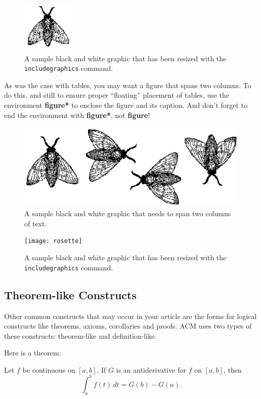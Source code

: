 \begin{figure}
    \includegraphics[height=1in, width=1in]{fly}
    \caption{A sample black and white graphic
    that has been resized with the \texttt{includegraphics} command.}
\end{figure}


As was the case with tables, you may want a figure that spans two
columns. To do this, and still to ensure proper ``floating''
placement of tables, use the environment \textbf{figure*} to enclose
the figure and its caption. And don't forget to end the environment
with \textbf{figure*}, not \textbf{figure}!

\begin{figure}
    \includegraphics{flies}
    \caption{A sample black and white graphic
    that needs to span two columns of text.}
\end{figure}


\begin{figure}
    \texttt{[image: rosette]}
    \caption{A sample black and white graphic that has
    been resized with the \texttt{includegraphics} command.}
\end{figure}

\subsection{Theorem-like Constructs}

Other common constructs that may occur in your article are the forms
for logical constructs like theorems, axioms, corollaries and proofs.
ACM uses two types of these constructs: theorem-like and
definition-like.

Here is a theorem:
\begin{theorem}
    Let $f$ be continuous on $[a,b]$. If $G$ is
    an antiderivative for $f$ on $[a,b]$, then
    \begin{displaymath}
        \int^b_af(t)\,dt = G(b) - G(a).
    \end{displaymath}
\end{theorem}

